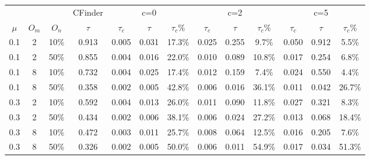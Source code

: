 \begin{table}[!hbt]
\begin{tabular}{ c c c || c | c c c | c c c | c c c }
\toprule\toprule
 	&  		& 		&	CFinder	&			&	c=0		&			&			&	c=2		&			&			&	c=5		&			\\
$\mu$&$O_m$	&$O_n$	&	$\tau$	&	$\tau_c$	&	$\tau$	&$\tau_c\%$	&	$\tau_c$	&	$\tau$	&$\tau_c\%$	&	$\tau_c$	&	$\tau$	&$\tau_c\%$	\\
\hline\hline
0.1	&	2	&	10\%	&	0.913	&	0.005	&	0.031	&	17.3\%	&	0.025	&	0.255	&	9.7\%	&	0.050	&	0.912	&	5.5\%	\\
0.1	&	2	&	50\%	&	0.855	&	0.004	&	0.016	&	22.0\%	&	0.010	&	0.089	&	10.8\%	&	0.017	&	0.254	&	6.8\%	\\
0.1	&	8	&	10\%	&	0.732	&	0.004	&	0.025	&	17.4\%	&	0.012	&	0.159	&	7.4\%	&	0.024	&	0.550	&	4.4\%	\\
0.1	&	8	&	50\%	&	0.358	&	0.002	&	0.005	&	42.8\%	&	0.006	&	0.016	&	36.1\%	&	0.011	&	0.042	&	26.7\%	\\
0.3	&	2	&	10\%	&	0.592	&	0.004	&	0.013	&	26.0\%	&	0.011	&	0.090	&	11.8\%	&	0.027	&	0.321	&	8.3\%	\\
0.3	&	2	&	50\%	&	0.434	&	0.002	&	0.006	&	38.1\%	&	0.006	&	0.024	&	27.2\%	&	0.013	&	0.068	&	18.4\%	\\
0.3	&	8	&	10\%	&	0.472	&	0.003	&	0.011	&	25.7\%	&	0.008	&	0.064	&	12.5\%	&	0.016	&	0.205	&	7.6\%	\\
0.3	&	8	&	50\%	&	0.326	&	0.002	&	0.005	&	50.0\%	&	0.006	&	0.011	&	54.9\%	&	0.017	&	0.034	&	51.3\%	\\\bottomrule\bottomrule
\end{tabular}

\end{table}
